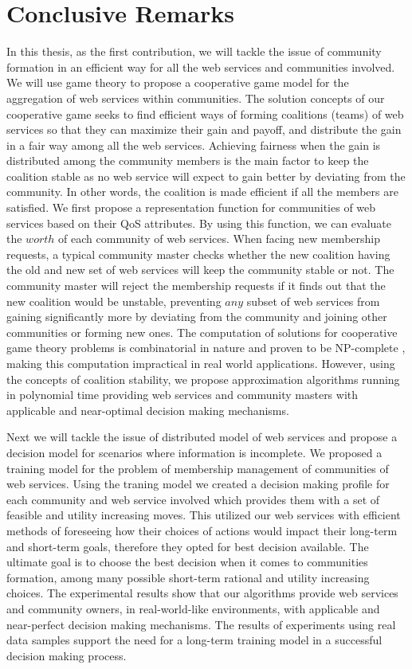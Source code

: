 \section{Conclusive Remarks}

In this thesis, as the first contribution, we will tackle the issue of community formation in an efficient way for all the web services and communities involved. We will use game theory to propose a cooperative game model for the aggregation of web services within communities. The solution concepts of our cooperative game seeks to find efficient ways of forming coalitions (teams) of web services so that they can maximize their gain and payoff, and distribute the gain in a fair way among all the web services. Achieving fairness when the gain is distributed among the community members is the main factor to keep the coalition stable as no web service will expect to gain better by deviating from the community. In other words, the coalition is made efficient if all the members are satisfied. We first propose a representation function for communities of web services based on their QoS attributes. By using this function, we can evaluate the $worth$ of each community of web services. When facing new membership requests, a typical community master checks whether the new coalition having the old and new set of web services will keep the community stable or not. The community master will reject the membership requests if it finds out that the new coalition would be unstable, preventing $any$ subset of web services from gaining significantly more by deviating from the community and joining other communities or forming new ones. The computation of solutions for cooperative game theory problems is combinatorial in nature and proven to be NP-complete \cite{Algorithmic}, making this computation impractical in real world applications. However, using the concepts of coalition stability, we propose approximation algorithms running in polynomial time providing web services and community masters with applicable and near-optimal decision making mechanisms.

Next we will tackle the issue of distributed model of web services and propose a decision model for scenarios where information is incomplete. We proposed a training model for the problem of membership management of communities of web services. Using the traning model we created a decision making profile for each community and web service involved which provides them with a set of feasible and utility increasing moves. This utilized our web services with efficient methods of foreseeing how their choices of actions would impact their long-term and short-term goals, therefore they opted for best decision available. The ultimate goal is to choose the best decision when it comes to communities formation, among many possible short-term rational and utility increasing choices. The experimental results show that our algorithms provide web services and community owners, in real-world-like environments, with applicable and near-perfect decision making mechanisms. The results of experiments using real data samples support the need for a long-term training model in a successful decision making process.

